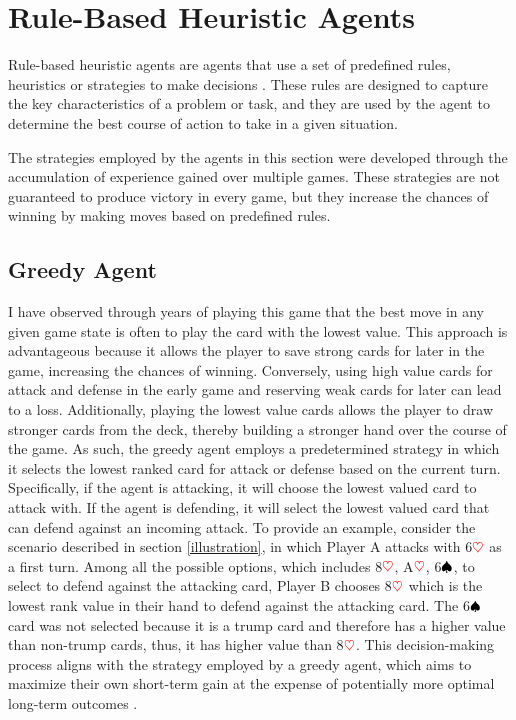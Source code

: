 \section{Rule-Based Heuristic Agents}

Rule-based heuristic agents are agents that use a set of predefined rules, heuristics or strategies to make decisions \citep{millington_funge_2009}. These rules are designed to capture the key characteristics of a problem or task, and they are used by the agent to determine the best course of action to take in a given situation.

The strategies employed by the agents in this section were developed through the accumulation of experience gained over multiple games. These strategies are not guaranteed to produce victory in every game, but they increase the chances of winning by making moves based on predefined rules. 

\subsection{Greedy Agent}

I have observed through years of playing this game that the best move in any given game state is often to play the card with the lowest value. This approach is advantageous because it allows the player to save strong cards for later in the game, increasing the chances of winning. Conversely, using high value cards for attack and defense in the early game and reserving weak cards for later can lead to a loss. Additionally, playing the lowest value cards allows the player to draw stronger cards from the deck, thereby building a stronger hand over the course of the game. As such, the greedy agent employs a predetermined strategy in which it selects the lowest ranked card for attack or defense based on the current turn. Specifically, if the agent is attacking, it will choose the lowest valued card to attack with. If the agent is defending, it will select the lowest valued card that can defend against an incoming attack. To provide an example, consider the scenario described in section \ref{illustration}, in which Player A attacks with 6$\textcolor{red}{\heartsuit}$ as a first turn. Among all the possible options, which includes 8$\textcolor{red}{\heartsuit}$, A$\textcolor{red}{\heartsuit}$, 6$\textcolor{black}{\spadesuit}$, to select to defend against the attacking card, Player B chooses 8$\textcolor{red}{\heartsuit}$ which is the lowest rank value in their hand to defend against the attacking card. The 6$\textcolor{black}{\spadesuit}$ card was not selected because it is a trump card and therefore has a higher value than non-trump cards, thus, it has higher value than 8$\textcolor{red}{\heartsuit}$. This decision-making process aligns with the strategy employed by a greedy agent, which aims to maximize their own short-term gain at the expense of potentially more optimal long-term outcomes \citep{AI4Ed}.

